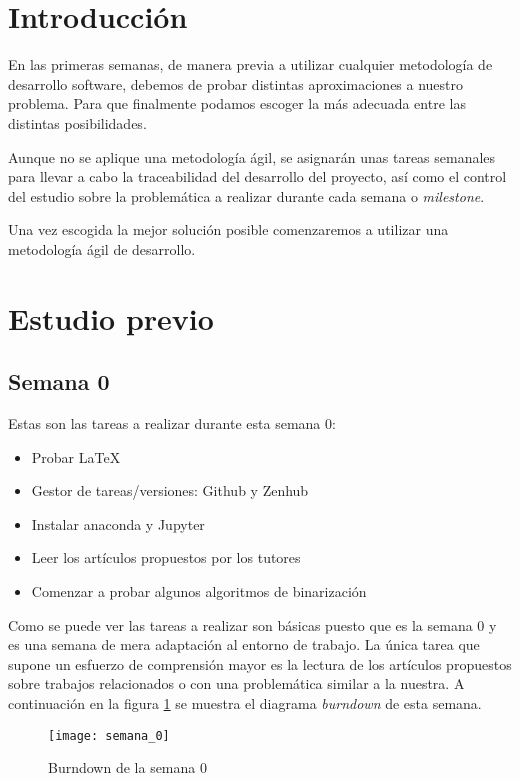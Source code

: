 
\section{Introducción}
En las primeras semanas, de manera previa a utilizar cualquier metodología de desarrollo software, debemos de probar distintas aproximaciones a nuestro problema. Para que finalmente podamos escoger la más adecuada entre las distintas posibilidades.

Aunque no se aplique una metodología ágil, se asignarán unas tareas semanales para llevar a cabo la traceabilidad del desarrollo del proyecto, así como el control del estudio sobre la problemática a realizar durante cada semana o \textit{milestone}.

Una vez escogida la mejor solución posible comenzaremos a utilizar una metodología ágil de desarrollo.

\section{Estudio previo}

\subsection{Semana 0}
Estas son las tareas a realizar durante esta semana 0:

\begin{itemize}
	\item Probar LaTeX
	\item Gestor de tareas/versiones: Github y Zenhub
	\item Instalar anaconda y Jupyter
	\item Leer los artículos propuestos por los tutores
	\item Comenzar a probar algunos algoritmos de binarización
\end{itemize}

Como se puede ver las tareas a realizar son básicas puesto que es la semana 0 y es una semana de mera adaptación al entorno de trabajo. La única tarea que supone un esfuerzo de comprensión mayor es la lectura de los artículos propuestos sobre trabajos relacionados o con una problemática similar a la nuestra. A continuación en la figura \ref{fig:A.1.1} se muestra el diagrama \textit{burndown} de esta semana. 

\begin{figure}[h]
\centering
\texttt{[image: semana\_0]}
\caption{Burndown de la semana 0}
\label{fig:A.1.1}
\end{figure}

